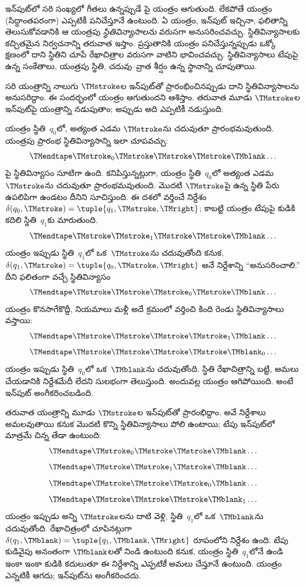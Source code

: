 \documentclass[../../../include/open-logic-section]{subfiles}
\begin{document}
\begin{explain}
ఇన్‌పుట్‌లో సరి సంఖ్యలో గీతలు ఉన్నప్పుడే పై యంత్రం ఆగుతుంది. లేకపోతే యంత్రం
(సిద్ధాంతపరంగా) ఎప్పటికీ పనిచేస్తూనే ఉంటుంది. ఏ యంత్రం, ఇన్‌పుట్ ఇచ్చినా,
ఫలితాన్ని తెలుసుకోవడానికి ఆ యంత్రపు \emph{స్థితివిన్యాసాలను} వరుసగా
అనుసరించవచ్చు. స్థితివిన్యాసాలకు కచ్చితమైన నిర్వచనాన్ని తరువాత ఇస్తాం.
ప్రస్తుతానికి యంత్రం పనిచేస్తున్నప్పుడు ఒక్కో క్షణంలో దాని స్థితిని
చూపే రేఖాచిత్రాల వరుసగా వాటిని భావించవచ్చు.
స్థితివిన్యాసాలు టేపుపై ఉన్న సంకేతాలు, యంత్రపు స్థితి, చదువు--వ్రాత శీర్షం ఉన్న స్థానాన్ని
చూపుతాయి.

సరి యంత్రాన్ని నాలుగు $\TMstroke$ల ఇన్‌పుట్‌తో ప్రారంభించినప్పుడు దాని
స్థితివిన్యాసాలను అనుసరిద్దాం. ఈ సందర్భంలో యంత్రం ఆగుతుందని ఆశిస్తాం. తరువాత
మూడు $\TMstroke$ల ఇన్‌పుట్‌పై యంత్రాన్ని నడుపుతాం; అప్పుడు అది ఎప్పటికీ
నడుస్తుంది.

యంత్రం స్థితి~$q_0$లో, అత్యంత ఎడమ $\TMstroke$ను చదువుతూ ప్రారంభమవుతుంది.
యంత్రపు ప్రారంభ స్థితివిన్యాసాన్ని ఇలా చూపవచ్చు:
\[
\TMendtape \TMstroke_0 \TMstroke \TMstroke \TMstroke \TMblank \ldots
\]
పై స్థితివిన్యాసం సూటిగా ఉంది. కనిపిస్తున్నట్లుగా, యంత్రం స్థితి~$q_0$లో
అత్యంత ఎడమ $\TMstroke$ను చదువుతూ ప్రారంభమవుతుంది. మొదటి $\TMstroke$పై ఉన్న
స్థితి పేరు ఉపలిపిగా ఉండటం దీనిని సూచిస్తుంది. ఈ దశలో వర్తించే నిర్దేశం
$\delta(q_0, \TMstroke) = \tuple{q_1, \TMstroke, \TMright}$; కాబట్టి యంత్రం
టేపుపై కుడికి కదిలి స్థితి~$q_1$కు మారుతుంది.
\[
\TMendtape \TMstroke \TMstroke_1 \TMstroke \TMstroke \TMblank \ldots
\]
యంత్రం ఇప్పుడు స్థితి~$q_1$లో ఒక~$\TMstroke$ను చదువుతోంది కనుక,
$\delta(q_1, \TMstroke) = \tuple{q_0, \TMstroke, \TMright}$ అనే నిర్దేశాన్ని
``అనుసరించాలి.'' దీని ఫలితంగా వచ్చే స్థితివిన్యాసం
\[
\TMendtape \TMstroke \TMstroke \TMstroke_0 \TMstroke \TMblank \ldots
\]
యంత్రం కొనసాగేకొద్దీ, నియమాలు మళ్లీ అదే క్రమంలో వర్తించి కింది రెండు
స్థితివిన్యాసాలు వస్తాయి:
\[
\TMendtape \TMstroke \TMstroke \TMstroke \TMstroke_1 \TMblank \ldots
\]
\[
\TMendtape \TMstroke \TMstroke \TMstroke \TMstroke \TMblank_0 \ldots
\]
యంత్రం ఇప్పుడు స్థితి~$q_0$లో ఒక~$\TMblank$ను చదువుతోంది. స్థితి రేఖాచిత్రాన్ని
బట్టి, అమలు చేయడానికి నిర్దేశమేదీ లేదని సులభంగా తెలుస్తుంది. అందువల్ల యంత్రం
ఆగిపోయింది. అంటే ఇన్‌పుట్ అంగీకరించబడింది.

తరువాత యంత్రాన్ని మూడు $\TMstroke$ల ఇన్‌పుట్‌తో ప్రారంభిద్దాం. అవే నిర్దేశాలు
అమలవుతాయి కనుక మొదటి కొన్ని స్థితివిన్యాసాలు పోలి ఉంటాయి; టేపు ఇన్‌పుట్‌లో
మాత్రమే చిన్న తేడా ఉంటుంది:
\[
\TMendtape \TMstroke_0 \TMstroke \TMstroke \TMblank \ldots
\]
\[
\TMendtape \TMstroke \TMstroke_1 \TMstroke \TMblank \ldots
\]
\[
\TMendtape \TMstroke \TMstroke \TMstroke_0 \TMblank \ldots
\]
\[
\TMendtape \TMstroke \TMstroke \TMstroke \TMblank_1 \ldots
\]
యంత్రం ఇప్పుడు అన్ని $\TMstroke$లను దాటి వెళ్లి, స్థితి~$q_1$లో ఒక~$\TMblank$ను
చదువుతోంది. రేఖాచిత్రంలో చూపినట్లుగా $\delta(q_1, \TMblank) =
\tuple{q_1, \TMblank, \TMright}$ రూపంలోని నిర్దేశం ఉంది. టేపు కుడివైపు
అనంతంగా $\TMblank$లతో నిండి ఉంటుంది కనుక, యంత్రం స్థితి~$q_1$లోనే ఉండి ఇంకా
ఇంకా కుడికి కదులుతూ ఈ నిర్దేశాన్ని \emph{ఎప్పటికీ} అమలు చేస్తూనే ఉంటుంది.
యంత్రం ఎన్నటికీ ఆగదు; ఇన్‌పుట్‌ను అంగీకరించదు.
\end{explain}
\end{document}

